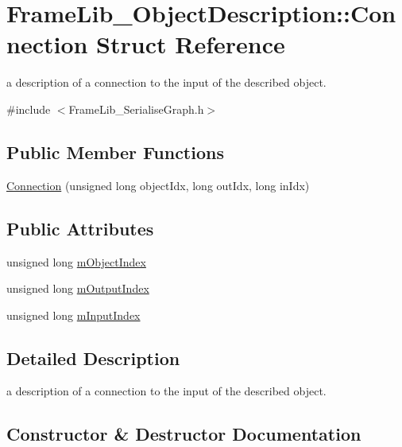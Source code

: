 \hypertarget{struct_frame_lib___object_description_1_1_connection}{}\section{Frame\+Lib\+\_\+\+Object\+Description\+:\+:Connection Struct Reference}
\label{struct_frame_lib___object_description_1_1_connection}


a description of a connection to the input of the described object.  




{\ttfamily \#include $<$Frame\+Lib\+\_\+\+Serialise\+Graph.\+h$>$}

\subsection*{Public Member Functions}
\begin{DoxyCompactItemize}
\item 
\hyperlink{struct_frame_lib___object_description_1_1_connection_ae7adfde2b957d21fd01cc9fbaff4dc92}{Connection} (unsigned long object\+Idx, long out\+Idx, long in\+Idx)
\end{DoxyCompactItemize}
\subsection*{Public Attributes}
\begin{DoxyCompactItemize}
\item 
unsigned long \hyperlink{struct_frame_lib___object_description_1_1_connection_a2f78249a68e96a89a5c811759f807de2}{m\+Object\+Index}
\item 
unsigned long \hyperlink{struct_frame_lib___object_description_1_1_connection_a99307659f4c0672b38986604c33e914d}{m\+Output\+Index}
\item 
unsigned long \hyperlink{struct_frame_lib___object_description_1_1_connection_a31a4e343025be67a0205f6f5b83a305b}{m\+Input\+Index}
\end{DoxyCompactItemize}


\subsection{Detailed Description}
a description of a connection to the input of the described object. 

\subsection{Constructor \& Destructor Documentation}
\mbox{\label{struct_frame_lib___object_description_1_1_connection_ae7adfde2b957d21fd01cc9fbaff4dc92}} 
